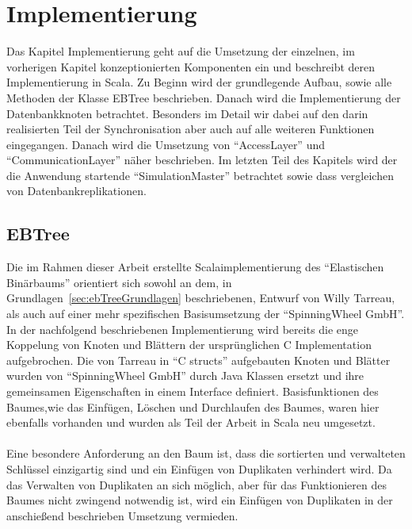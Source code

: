 \documentclass[a4paper,11pt,oneside,%
headsepline,												%
footsepline,												%
bibtotocnumbered									%
]{scrreprt}
\begin{document}
\chapter{Implementierung}
Das Kapitel Implementierung geht auf die Umsetzung der einzelnen, im vorherigen Kapitel konzeptionierten Komponenten ein und beschreibt deren Implementierung in Scala. Zu Beginn wird der grundlegende Aufbau, sowie alle Methoden der Klasse EBTree beschrieben. Danach wird die Implementierung der Datenbankknoten betrachtet. Besonders im Detail wir dabei auf den darin realisierten Teil der Synchronisation aber auch auf alle weiteren Funktionen eingegangen. Danach wird die Umsetzung von \enquote{AccessLayer} und \enquote{CommunicationLayer} näher  beschrieben. Im letzten Teil des Kapitels wird der die Anwendung startende  \enquote{SimulationMaster} betrachtet sowie dass vergleichen von Datenbankreplikationen.
\section{EBTree} 
\label{sec:EbTreeImpl}
Die im Rahmen dieser Arbeit erstellte Scalaimplementierung des \enquote{Elastischen Binärbaums} orientiert sich sowohl an dem, in Grundlagen~\ref{sec:ebTreeGrundlagen} beschriebenen, Entwurf von Willy Tarreau\autocite{Tarreau}, als auch auf einer mehr spezifischen Basisumsetzung der \enquote{SpinningWheel GmbH}.\\
In der nachfolgend beschriebenen Implementierung  wird bereits die enge Koppelung von Knoten und Blättern der ursprünglichen C Implementation aufgebrochen. Die von Tarreau in \enquote{C structs} aufgebauten Knoten und Blätter wurden von \enquote{SpinningWheel GmbH} durch Java Klassen ersetzt und ihre gemeinsamen Eigenschaften in einem Interface definiert. Basisfunktionen des Baumes,wie das Einfügen, Löschen und Durchlaufen des Baumes, waren hier ebenfalls vorhanden und wurden als Teil der Arbeit in Scala neu umgesetzt.\\\\
Eine besondere Anforderung an den Baum ist, dass die sortierten und verwalteten Schlüssel einzigartig sind und ein Einfügen von Duplikaten verhindert wird. Da das Verwalten von Duplikaten an sich möglich, aber für das Funktionieren des Baumes nicht zwingend notwendig ist, wird ein Einfügen von Duplikaten in der anschießend beschrieben Umsetzung vermieden. \\
\end{document}
